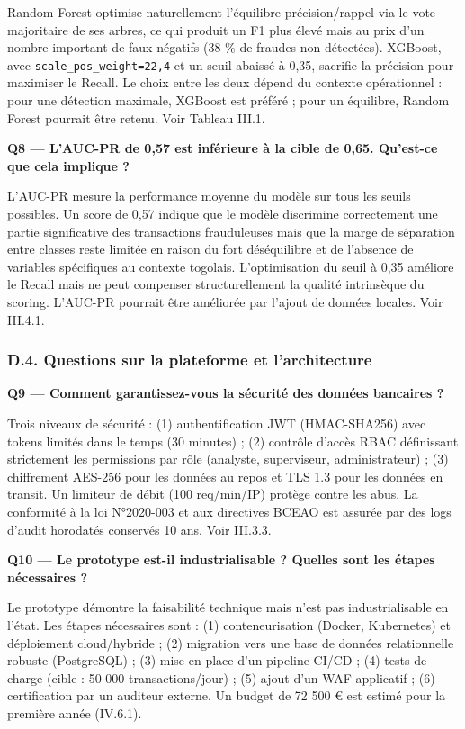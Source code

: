 \documentclass[
  12pt,
]{article}
\begin{document}
Random Forest optimise naturellement l’équilibre précision/rappel via le
vote majoritaire de ses arbres, ce qui produit un F1 plus élevé mais au
prix d’un nombre important de faux négatifs (38 \% de fraudes non
détectées). XGBoost, avec \texttt{scale\_pos\_weight=22,4} et un seuil
abaissé à 0,35, sacrifie la précision pour maximiser le Recall. Le choix
entre les deux dépend du contexte opérationnel : pour une détection
maximale, XGBoost est préféré ; pour un équilibre, Random Forest
pourrait être retenu. Voir Tableau III.1.

\textbf{Q8 — L’AUC-PR de 0,57 est inférieure à la cible de 0,65.
Qu’est-ce que cela implique ?}

L’AUC-PR mesure la performance moyenne du modèle sur tous les seuils
possibles. Un score de 0,57 indique que le modèle discrimine
correctement une partie significative des transactions frauduleuses mais
que la marge de séparation entre classes reste limitée en raison du fort
déséquilibre et de l’absence de variables spécifiques au contexte
togolais. L’optimisation du seuil à 0,35 améliore le Recall mais ne peut
compenser structurellement la qualité intrinsèque du scoring. L’AUC-PR
pourrait être améliorée par l’ajout de données locales. Voir III.4.1.

\subsubsection{D.4. Questions sur la plateforme et
l’architecture}\label{d.4.-questions-sur-la-plateforme-et-larchitecture}

\textbf{Q9 — Comment garantissez-vous la sécurité des données bancaires
?}

Trois niveaux de sécurité : (1) authentification JWT (HMAC-SHA256) avec
tokens limités dans le temps (30 minutes) ; (2) contrôle d’accès RBAC
définissant strictement les permissions par rôle (analyste, superviseur,
administrateur) ; (3) chiffrement AES-256 pour les données au repos et
TLS 1.3 pour les données en transit. Un limiteur de débit (100
req/min/IP) protège contre les abus. La conformité à la loi N°2020-003
et aux directives BCEAO est assurée par des logs d’audit horodatés
conservés 10 ans. Voir III.3.3.

\textbf{Q10 — Le prototype est-il industrialisable ? Quelles sont les
étapes nécessaires ?}

Le prototype démontre la faisabilité technique mais n’est pas
industrialisable en l’état. Les étapes nécessaires sont : (1)
conteneurisation (Docker, Kubernetes) et déploiement cloud/hybride ; (2)
migration vers une base de données relationnelle robuste (PostgreSQL) ;
(3) mise en place d’un pipeline CI/CD ; (4) tests de charge (cible : 50
000 transactions/jour) ; (5) ajout d’un WAF applicatif ; (6)
certification par un auditeur externe. Un budget de 72 500 € est estimé
pour la première année (IV.6.1).
\end{document}
